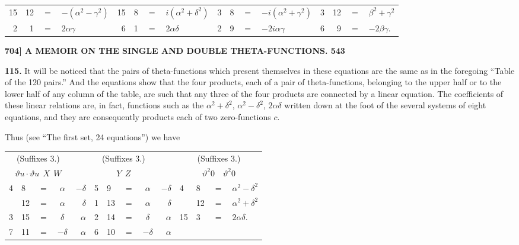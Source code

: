 \documentclass[11pt]{article}
\begin{document}
{\begin{center}
\begin{tabular}{rrcrl||rrcrl||rrcrl||rrcrl}
15 & 12 & $=$ & \multicolumn{2}{l||}{$-(\alpha^2 - \gamma^2)$} & 15 & 8 & $=$ & \multicolumn{2}{l||}{$i(\alpha^2 + \delta^2)$} & 3 & 8 & $=$ & \multicolumn{2}{l||}{$-i(\alpha^2 + \gamma^2)$} & 3 & 12 & $=$ & \multicolumn{2}{l}{$\beta^2 + \gamma^2$}\\
2 & 1 & $=$ & \multicolumn{2}{l||}{$2\alpha\gamma$} & 6 & 1 & $=$ & \multicolumn{2}{l||}{$2\alpha\delta$} & 2 & 9 & $=$ & \multicolumn{2}{l||}{$-2i\alpha\gamma$} & 6 & 9 & $=$ & \multicolumn{2}{l}{$-2\beta\gamma$.}\\
\end{tabular}
\end{center}
}

\newpage
\noindent\textbf{704] \quad A MEMOIR ON THE SINGLE AND DOUBLE THETA-FUNCTIONS. \hfill 543}

\medskip
\textbf{115.} It will be noticed that the pairs of theta-functions which present themselves in these equations are the same as in the foregoing ``Table of the 120 pairs.'' And the equations show that the four products, each of a pair of theta-functions, belonging to the upper half or to the lower half of any column of the table, are such that any three of the four products are connected by a linear equation. The coefficients of these linear relations are, in fact, functions such as the $\alpha^2 + \delta^2$, $\alpha^2 - \delta^2$, $2\alpha\delta$ written down at the foot of the several systems of eight equations, and they are consequently products each of two zero-functions $c$.

\medskip
Thus (see ``The first set, 24 equations'') we have

\smallskip
\begin{center}
\begin{tabular}{lllcrlllcrllrcr}
\multicolumn{4}{c}{(Suffixes 3.)} & & \multicolumn{4}{c}{(Suffixes 3.)} & & \multicolumn{5}{c}{(Suffixes 3.)}\\
\multicolumn{4}{c}{$\vartheta u\cdot \vartheta u\ \ X\ \ W$} & & \multicolumn{4}{c}{$Y\ \ Z$} & & \multicolumn{5}{c}{$\vartheta^2 0\quad \vartheta^2 0$}\\
4  & 8 &$=$& $\alpha$ & $-\delta$ & 5 & 9 &$=$& $\alpha$ & $-\delta$ & 4 & 8 &$=$& \multicolumn{2}{l}{$\alpha^2 - \delta^2$}\\
   & 12&$=$& $\alpha$ & $\delta$  & 1 & 13&$=$& $\alpha$ & $\delta$ &   & 12 &$=$& \multicolumn{2}{l}{$\alpha^2 + \delta^2$}\\
3  & 15&$=$& $\delta$ & $\alpha$  & 2 & 14&$=$& $\delta$ & $\alpha$ & 15 & 3 &$=$& \multicolumn{2}{l}{$2\alpha\delta$.}\\
7  & 11&$=$& $-\delta$& $\alpha$  & 6 & 10&$=$& $-\delta$& $\alpha$ & & & & & \\
\end{tabular}
\end{center}
\end{document}
